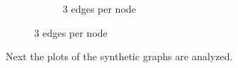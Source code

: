 \begin{figure}[H]
\begin{subfigure}[t]{0.75\linewidth}
        \caption{3 edges per node}
        \label{fig:3mvm}
    \end{subfigure}
\end{figure}



Next the plots of the synthetic graphs are analyzed. 


